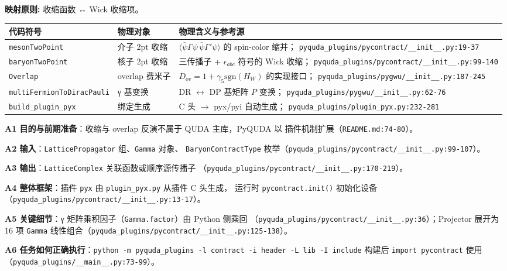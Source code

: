 \documentclass[UTF8]{ctexart}
\begin{document}
\begin{mapbox}
\textbf{映射原则:} 收缩函数 ↔ Wick 收缩项。
\end{mapbox}
\begin{xltabular}{\textwidth}{llX}
\toprule
\textcolor{map}{代码符号} & 物理对象 & 物理含义与参考源 \\
\midrule
\endhead
\texttt{mesonTwoPoint} & 介子 2pt 收缩 &
$\langle \bar\psi \Gamma \psi \,\bar\psi \Gamma' \psi\rangle$ 的 spin-color 缩并；
\texttt{\nolinkurl{pyquda_plugins/pycontract/__init__.py:19-37}} \\
\texttt{baryonTwoPoint} & 核子 2pt 收缩 &
三传播子 + $\epsilon_{abc}$ 符号的 Wick 收缩；
\texttt{\nolinkurl{pyquda_plugins/pycontract/__init__.py:99-140}} \\
\texttt{Overlap} & overlap 费米子 &
$D_{ov}=1+\gamma_5\mathrm{sgn}(H_W)$ 的实现接口；
\texttt{\nolinkurl{pyquda_plugins/pygwu/__init__.py:187-245}} \\
\texttt{multiFermionToDiracPauli} & γ 基变换 &
DR $\leftrightarrow$ DP 基矩阵 $P$ 变换；
\texttt{\nolinkurl{pyquda_plugins/pygwu/__init__.py:62-76}} \\
\texttt{build\_plugin\_pyx} & 绑定生成 &
C 头 $\rightarrow$ pyx/pyi 自动生成；
\texttt{\nolinkurl{pyquda_plugins/plugin_pyx.py:232-281}} \\
\bottomrule
\end{xltabular}

\textbf{A1 目的与前期准备}：收缩与 overlap 反演不属于 QUDA 主库，PyQUDA 以
插件机制扩展（\texttt{\nolinkurl{README.md:74-80}}）。

\textbf{A2 输入}：\texttt{LatticePropagator} 组、\texttt{Gamma} 对象、
\texttt{BaryonContractType} 枚举（\texttt{\nolinkurl{pyquda_plugins/pycontract/__init__.py:99-107}}）。

\textbf{A3 输出}：\texttt{LatticeComplex} 关联函数或顺序源传播子
（\texttt{\nolinkurl{pyquda_plugins/pycontract/__init__.py:170-219}}）。

\textbf{A4 整体框架}：插件 \texttt{pyx} 由 \texttt{plugin\_pyx.py} 从插件 C 头生成，
运行时 \texttt{pycontract.init()} 初始化设备（\texttt{\nolinkurl{pyquda_plugins/pycontract/__init__.py:13-17}}）。

\textbf{A5 关键细节}：γ 矩阵乘积因子（\texttt{Gamma.factor}）由 Python 侧乘回
（\texttt{\nolinkurl{pyquda_plugins/pycontract/__init__.py:36}}）；Projector 展开为
16 项 \texttt{Gamma} 线性组合（\texttt{\nolinkurl{pyquda_plugins/pycontract/__init__.py:125-138}}）。

\textbf{A6 任务如何正确执行}：\texttt{python -m pyquda\_plugins -l contract -i header -L lib -I include}
构建后 \texttt{import pycontract} 使用（\texttt{\nolinkurl{pyquda_plugins/__main__.py:73-99}}）。
\end{document}
